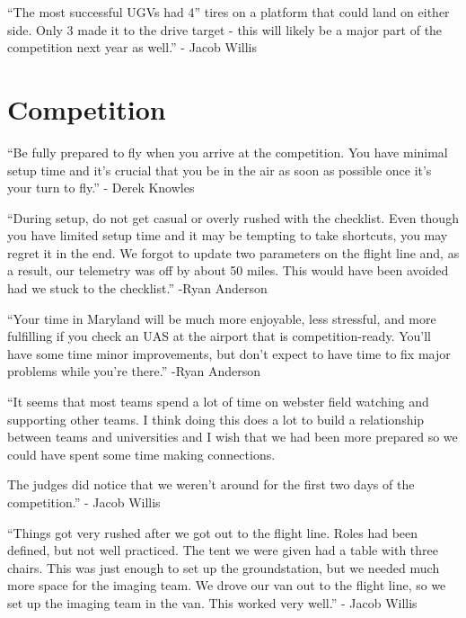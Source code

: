 \documentclass[]{auvsi_doc}
\begin{document}
{}

{``The most successful UGVs had 4'' tires on a platform that could land
on either side. Only 3 made it to the drive target - this will likely be
a major part of the competition next year as well.'' - Jacob Willis}

\section{Competition}

{``Be fully prepared to fly when you arrive at the competition. You have
minimal setup time and it's crucial that you be in the air as soon as
possible once it's your turn to fly.'' - Derek Knowles}

{}

{``During setup, do not get casual or overly rushed with the checklist.
Even though you have limited setup time and it may be tempting to take
shortcuts, you may regret it in the end. We forgot to update two
parameters on the flight line and, as a result, our telemetry was off by
about 50 miles. This would have been avoided had we stuck to the
checklist.'' -Ryan Anderson}

{}

{``Your time in Maryland will be much more enjoyable, less stressful,
and more fulfilling if you check an UAS at the airport that is
competition-ready. You'll have some time minor improvements, but don't
expect to have time to fix major problems while you're there.'' -Ryan
Anderson}

{}

{``It seems that most teams spend a lot of time on webster field
watching and supporting other teams. I think doing this does a lot to
build a relationship between teams and universities and I wish that we
had been more prepared so we could have spent some time making
connections.}

{The judges did notice that we weren't around for the first two days of
the competition.'' - Jacob Willis}

{}

{``Things got very rushed after we got out to the flight line. Roles had
been defined, but not well practiced. The tent we were given had a table
with three chairs. This was just enough to set up the groundstation, but
we needed much more space for the imaging team. We drove our van out to
the flight line, so we set up the imaging team in the van. This worked
very well.'' - Jacob Willis}

{}
\end{document}
